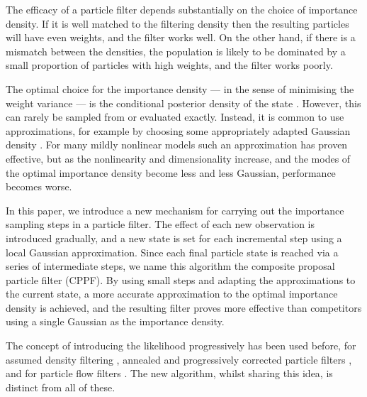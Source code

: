 \documentclass[conference]{IEEEtran}
\begin{document}
The efficacy of a particle filter depends substantially on the choice of importance density. If it is well matched to the filtering density then the resulting particles will have even weights, and the filter works well. On the other hand, if there is a mismatch between the densities, the population is likely to be dominated by a small proportion of particles with high weights, and the filter works poorly.

The optimal choice for the importance density --- in the sense of minimising the weight variance --- is the conditional posterior density of the state \cite{Doucet2000a}. However, this can rarely be sampled from or evaluated exactly. Instead, it is common to use approximations, for example by choosing some appropriately adapted Gaussian density \cite{Doucet2000a,Merwe2000}. For many mildly nonlinear models such an approximation has proven effective, but as the nonlinearity and dimensionality increase, and the modes of the optimal importance density become less and less Gaussian, performance becomes worse.

In this paper, we introduce a new mechanism for carrying out the importance sampling steps in a particle filter. The effect of each new observation is introduced gradually, and a new state is set for each incremental step using a local Gaussian approximation. Since each final particle state is reached via a series of intermediate steps, we name this algorithm the composite proposal particle filter (CPPF). By using small steps and adapting the approximations to the current state, a more accurate approximation to the optimal importance density is achieved, and the resulting filter proves more effective than competitors using a single Gaussian as the importance density.

The concept of introducing the likelihood progressively has been used before, for assumed density filtering \cite{Hanebeck2003,Hagmar2011}, annealed and progressively corrected particle filters \cite{Godsill2001b,Gall2007,Deutscher2000,Oudjane2000}, and for particle flow filters \cite{Daum2011d}. The new algorithm, whilst sharing this idea, is distinct from all of these.

\end{document}
